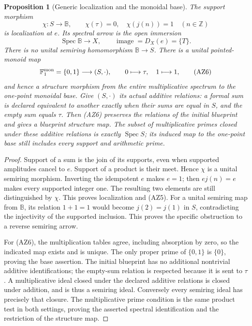\documentclass[11pt,a4paper]{article}
\newtheorem{proposition}[theorem]{Proposition}
\theoremstyle{definition}\newtheorem{definition}[theorem]{Definition}
\newcommand{\Z}{\mathbb Z}\newcommand{\Q}{\mathbb Q}
\newcommand{\B}{\mathbb B}\newcommand{\N}{\mathbb N}
\newcommand{\Spec}{\operatorname{Spec}}\newcommand{\SpecMon}{\operatorname{Spec}_{\mathrm{mon}}}
\begin{document}
\begin{proposition}[Generic localization and the monoidal base]
The support morphism
\[
 \chi:S\longrightarrow\B,\qquad \chi(\tau)=0,\quad\chi(j(n))=1
 \quad(n\in\Z)
 \tag{AZ4}
\]
is localization at $e$. Its spectral arrow is the open immersion
\[
 \Spec\B\longrightarrow X,
 \qquad\operatorname{image}=D_X(e)=\{T\}.
 \tag{AZ5}
\]
There is no unital semiring homomorphism $\B\to S$. There is a unital
pointed-monoid map
\[
 \mathbb F_1^{\rm mon}=\{0,1\}\longrightarrow (S,\cdot),
 \qquad0\longmapsto\tau,\quad1\longmapsto1,
 \tag{AZ6}
\]
and hence a structure morphism from the entire multiplicative spectrum to
the one-point monoidal base. Give $(S,\cdot)$ its actual additive relations:
a formal sum is declared equivalent to another exactly when their sums
are equal in $S$, and the empty sum equals $\tau$. Then (AZ6) preserves
the relations of the initial blueprint and gives a blueprint structure map.
The subset of multiplicative primes closed under these additive relations
is exactly $\Spec S$; its induced map to the one-point base still includes
every support and arithmetic prime.
\end{proposition}
\begin{proof}
Support of a sum is the join of its supports, even when supported amplitudes
cancel to $e$. Support of a product is their meet. Hence $\chi$ is a
unital semiring morphism. Inverting the idempotent $e$ makes $e=1$;
then $ej(n)=e$ makes every supported integer one. The resulting two elements
are still distinguished by $\chi$. This proves localization and (AZ5).
For a unital semiring map from $\B$, its relation $1+1=1$ would become
$j(2)=j(1)$ in $S$, contradicting the injectivity of the supported inclusion.
This proves the specific obstruction to a reverse semiring arrow.

For (AZ6), the multiplication tables agree, including absorption by zero,
so the indicated map exists and is unique. The only proper prime of
$\{0,1\}$ is $\{0\}$, proving the base assertion. The initial blueprint
has no additional nontrivial additive identifications; the empty-sum
relation is respected because it is sent to $\tau$. A multiplicative ideal
closed under the declared additive relations is closed under addition,
and is thus a semiring ideal. Conversely every semiring ideal has precisely
that closure. The multiplicative prime condition is the same product test
in both settings, proving the asserted spectral identification and the
restriction of the structure map.
\end{proof}
\end{document}
